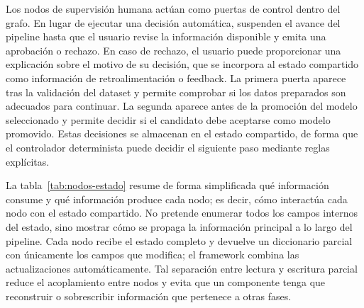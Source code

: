 \documentclass[12pt,a4paper]{article}
\theoremstyle{plain}
\begin{document}
Los nodos de supervisión humana actúan como puertas de control dentro del grafo. En lugar de ejecutar una decisión automática, suspenden el avance del pipeline hasta que el usuario revise la información disponible y emita una aprobación o rechazo. En caso de rechazo, el usuario puede proporcionar una explicación sobre el motivo de su decisión, que se incorpora al estado compartido como información de retroalimentación o feedback. La primera puerta aparece tras la validación del dataset y permite comprobar si los datos preparados son adecuados para continuar. La segunda aparece antes de la promoción del modelo seleccionado y permite decidir si el candidato debe aceptarse como modelo promovido. Estas decisiones se almacenan en el estado compartido, de forma que el controlador determinista puede decidir el siguiente paso mediante reglas explícitas.

La tabla~\ref{tab:nodos-estado} resume de forma simplificada qué información consume y qué información produce cada nodo; es decir, cómo interactúa cada nodo con el estado compartido. No pretende enumerar todos los campos internos del estado, sino mostrar cómo se propaga la información principal a lo largo del pipeline. Cada nodo recibe el estado completo y devuelve un diccionario parcial con únicamente los campos que modifica; el framework combina las actualizaciones automáticamente. Tal separación entre lectura y escritura parcial reduce el acoplamiento entre nodos y evita que un componente tenga que reconstruir o sobrescribir información que pertenece a otras fases.
\end{document}
